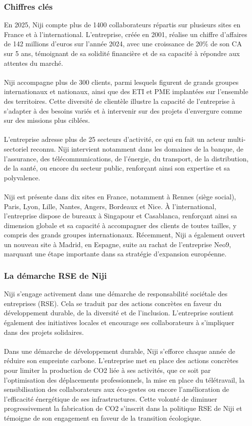 \documentclass[12pt]{article}
\begin{document}
\subsubsection{Chiffres clés}
En 2025, Niji compte plus de 1400 collaborateurs répartis sur plusieurs sites en France et à l'international. L'entreprise, créée en 2001, réalise un chiffre d'affaires de 142 millions d'euros sur l'année 2024, avec une croissance de 20\% de son CA sur 5 ans, témoignant de sa solidité financière et de sa capacité à répondre aux attentes du marché.
\\\\
Niji accompagne plus de 300 clients, parmi lesquels figurent de grands groupes internationaux et nationaux, ainsi que des ETI et PME implantées sur l'ensemble des territoires. Cette diversité de clientèle illustre la capacité de l'entreprise à s'adapter à des besoins variés et à intervenir sur des projets d'envergure comme sur des missions plus ciblées.
\\\\
L'entreprise adresse plus de 25 secteurs d’activité, ce qui en fait un acteur multi-sectoriel reconnu. Niji intervient notamment dans les domaines de la banque, de l’assurance, des télécommunications, de l’énergie, du transport, de la distribution, de la santé, ou encore du secteur public, renforçant ainsi son expertise et sa polyvalence.
\\\\
Niji est présente dans dix sites en France, notamment à Rennes (siège social), Paris, Lyon, Lille, Nantes, Angers, Bordeaux et Nice. À l’international, l’entreprise dispose de bureaux à Singapour et Casablanca, renforçant ainsi sa dimension globale et sa capacité à accompagner des clients de toutes tailles, y compris des grands groupes internationaux. Récemment, Niji a également ouvert un nouveau site à Madrid, en Espagne, suite au rachat de l'entreprise Neo9, marquant une étape importante dans sa stratégie d’expansion européenne.
\subsubsection{La démarche RSE de Niji}
Niji s'engage activement dans une démarche de responsabilité sociétale des entreprises (RSE). Cela se traduit par des actions concrètes en faveur du développement durable, de la diversité et de l'inclusion. L'entreprise soutient également des initiatives locales et encourage ses collaborateurs à s'impliquer dans des projets solidaires.
\\\\
Dans une démarche de développement durable, Niji s'efforce chaque année de réduire son empreinte carbone. L'entreprise met en place des actions concrètes pour limiter la production de CO2 liée à ses activités, que ce soit par l'optimisation des déplacements professionnels, la mise en place du télétravail, la sensibilisation des collaborateurs aux éco-gestes ou encore l'amélioration de l'efficacité énergétique de ses infrastructures. Cette volonté de diminuer progressivement la fabrication de CO2 s'inscrit dans la politique RSE de Niji et témoigne de son engagement en faveur de la transition écologique.
\end{document}

